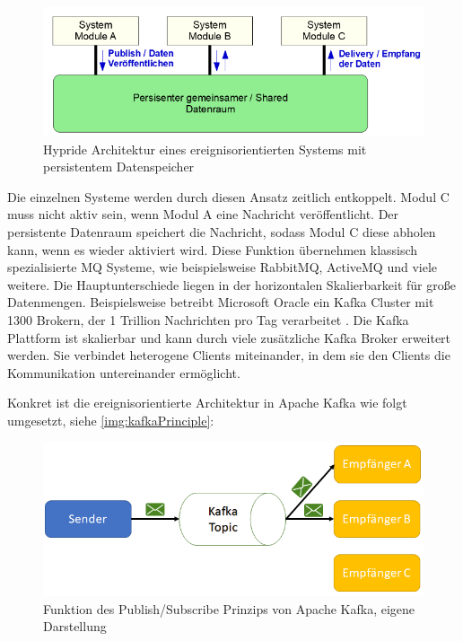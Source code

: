 \documentclass[a4paper,titlepage,halfparskip,12pt]{scrreprt}
\begin{document}
\begin{onehalfspacing}
\begin{figure}[h]
	\centering
	\includegraphics[width=.8\textwidth]{images/PublishSubscribeTanenbaum}
	\caption{Hypride Architektur eines ereignisorientierten Systems mit persistentem Datenspeicher \cite{richterArchitekturVS}}
	\label{img:PublishSubscribeTanenbaum}
\end{figure}

Die einzelnen Systeme werden durch diesen Ansatz zeitlich entkoppelt. Modul C muss nicht aktiv sein, wenn Modul A eine Nachricht veröffentlicht. Der persistente Datenraum speichert die Nachricht, sodass Modul C diese abholen kann, wenn es wieder aktiviert wird. Diese Funktion übernehmen klassisch spezialisierte \ac{MQ} Systeme, wie beispielsweise RabbitMQ, ActiveMQ und viele weitere. Die Hauptunterschiede liegen in der horizontalen Skalierbarkeit für große Datenmengen. Beispielsweise betreibt Microsoft Oracle ein Kafka Cluster mit 1300 Brokern, der 1 Trillion Nachrichten pro Tag verarbeitet \cite{ritchieKafkaMicrosoft}. Die Kafka Plattform ist skalierbar und kann durch viele zusätzliche Kafka Broker erweitert werden. Sie verbindet heterogene Clients miteinander, in dem sie den Clients die Kommunikation untereinander ermöglicht.

Konkret ist die ereignisorientierte Architektur in Apache Kafka wie folgt umgesetzt, siehe \autoref{img:kafkaPrinciple}:

\begin{figure}[h]
	\centering
	\includegraphics[width=.8\textwidth]{images/principleKafka}
	\caption{Funktion des Publish/Subscribe Prinzips von Apache Kafka, eigene Darstellung}
	\label{img:kafkaPrinciple}
\end{figure}


\end{onehalfspacing}
\end{document}

